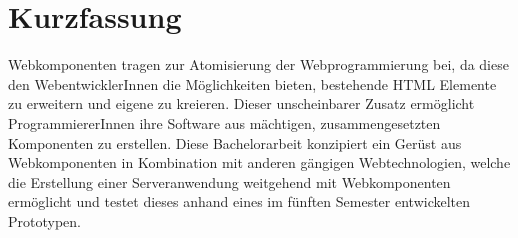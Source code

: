 \chapter{Kurzfassung}

Webkomponenten tragen zur Atomisierung der Webprogrammierung bei, da diese den WebentwicklerInnen die Möglichkeiten bieten, bestehende HTML Elemente zu erweitern und eigene zu kreieren. Dieser unscheinbarer Zusatz ermöglicht ProgrammiererInnen ihre Software aus mächtigen, zusammengesetzten Komponenten zu erstellen.
Diese Bachelorarbeit konzipiert ein Gerüst aus Webkomponenten in Kombination mit anderen gängigen Webtechnologien, welche die Erstellung einer Serveranwendung weitgehend mit Webkomponenten ermöglicht und testet dieses anhand eines im fünften Semester entwickelten Prototypen.


